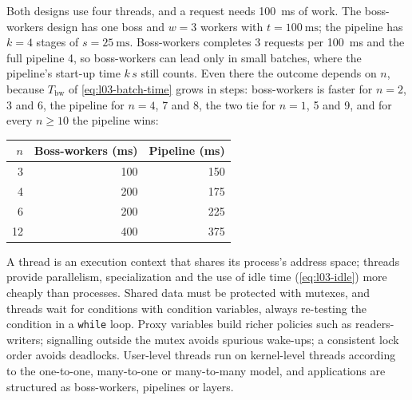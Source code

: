 \documentclass[../main.tex]{subfiles}
\begin{document}
\begin{example}
  Both designs use four threads, and a request needs
  \SI{100}{\milli\second} of work.  The boss-workers design has one boss and
  $w=3$ workers with $t=\SI{100}{\milli\second}$; the pipeline has $k=4$
  stages of $s=\SI{25}{\milli\second}$.  Boss-workers completes 3 requests
  per \SI{100}{\milli\second} and the full pipeline 4, so boss-workers can
  lead only in small batches, where the pipeline's start-up time $k\,s$
  still counts.  Even there the outcome depends on $n$, because
  $T_{\mathrm{bw}}$ of \cref{eq:l03-batch-time} grows in steps: boss-workers
  is faster for $n = 2$, 3 and 6, the pipeline for $n = 4$, 7 and 8, the
  two tie for $n = 1$, 5 and 9, and for every $n \geq 10$ the pipeline
  wins:
  \begin{center}
    \small
    \begin{tabular}{@{}rrr@{}}
      \toprule
      $n$ & Boss-workers (\si{\milli\second}) & Pipeline (\si{\milli\second}) \\
      \midrule
       3 & 100 & 150 \\
       4 & 200 & 175 \\
       6 & 200 & 225 \\
      12 & 400 & 375 \\
      \bottomrule
    \end{tabular}
  \end{center}
\end{example}

\begin{keypoint}
  A thread is an execution context that shares its process's address space;
  threads provide parallelism, specialization and the use of idle time
  (\cref{eq:l03-idle}) more cheaply than processes.  Shared data must be
  protected with mutexes, and threads wait for conditions with condition
  variables, always re-testing the condition in a \texttt{while} loop.
  Proxy variables build richer policies such as readers-writers; signalling
  outside the mutex avoids spurious wake-ups; a consistent lock order avoids
  deadlocks.  User-level threads run on kernel-level threads according to
  the one-to-one, many-to-one or many-to-many model, and applications are
  structured as boss-workers, pipelines or layers.
\end{keypoint}
\end{document}
